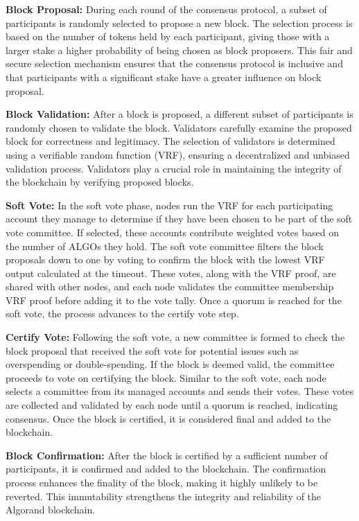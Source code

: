 \textbf{Block Proposal:}
During each round of the consensus protocol, a subset of participants is randomly selected to propose a new block. The selection process is based on the number of tokens held by each participant, giving those with a larger stake a higher probability of being chosen as block proposers. This fair and secure selection mechanism ensures that the consensus protocol is inclusive and that participants with a significant stake have a greater influence on block proposal.\newline

\textbf{Block Validation:}
After a block is proposed, a different subset of participants is randomly chosen to validate the block. Validators carefully examine the proposed block for correctness and legitimacy. The selection of validators is determined using a verifiable random function (VRF), ensuring a decentralized and unbiased validation process. Validators play a crucial role in maintaining the integrity of the blockchain by verifying proposed blocks.\newline

\textbf{Soft Vote:}
In the soft vote phase, nodes run the VRF for each participating account they manage to determine if they have been chosen to be part of the soft vote committee. If selected, these accounts contribute weighted votes based on the number of ALGOs they hold. The soft vote committee filters the block proposals down to one by voting to confirm the block with the lowest VRF output calculated at the timeout. These votes, along with the VRF proof, are shared with other nodes, and each node validates the committee membership VRF proof before adding it to the vote tally. Once a quorum is reached for the soft vote, the process advances to the certify vote step.\newline

\textbf{Certify Vote:}
Following the soft vote, a new committee is formed to check the block proposal that received the soft vote for potential issues such as overspending or double-spending. If the block is deemed valid, the committee proceeds to vote on certifying the block. Similar to the soft vote, each node selects a committee from its managed accounts and sends their votes. These votes are collected and validated by each node until a quorum is reached, indicating consensus. Once the block is certified, it is considered final and added to the blockchain.\newline

\textbf{Block Confirmation:}
After the block is certified by a sufficient number of participants, it is confirmed and added to the blockchain. The confirmation process enhances the finality of the block, making it highly unlikely to be reverted. This immutability strengthens the integrity and reliability of the Algorand blockchain.\newline

